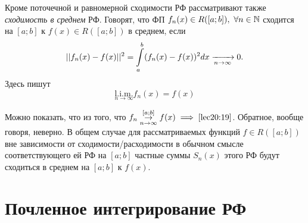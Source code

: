 \documentclass[../../main.tex]{subfiles}
\begin{document}
	\begin{rem}
		Кроме поточечной и равномерной сходимости РФ
		рассматривают также \emph{сходимость в среднем} РФ.
		Говорят, что ФП $ f_n(x) \in R([a; b]),\ \forall
		n \in \mathbb{N} $ сходится на $ [a; b] $ к $ f(x) \in 
		R([a; b]) $ в среднем, если \[||f_n(x) - f(x)||^2=
		\int\limits_{a}^b (f_n(x) - f(x))^2 dx \xrightarrow[n \to \infty]{} 0.\]
		Здесь пишут 
		\begin{equation}
		\label{lec20:19}
			\underset{n \to \infty}{\text{l.i.m.}} f_n(x) = f(x) 
		\end{equation}
	\end{rem}
	Можно показать, что из того, что $ f_n 
	\stackrel{[a; b]}{\underset{n \to \infty}{\to}} f(x) 
	\implies \eqref{lec20:19} $. Обратное, вообще говоря, неверно.
	В общем случае для рассматриваемых функций $ f \in R([a;b]) $
	вне зависимости от сходимости/расходимости в обычном смысле соответствующего 
	ей
	РФ на $ [a; b] $ частные суммы $ S_n(x) $ этого РФ
	будут сходиться в среднем на $ [a; b] $ к $ f(x) $.
	
	\section{Почленное интегрирование РФ}
	
\end{document}
